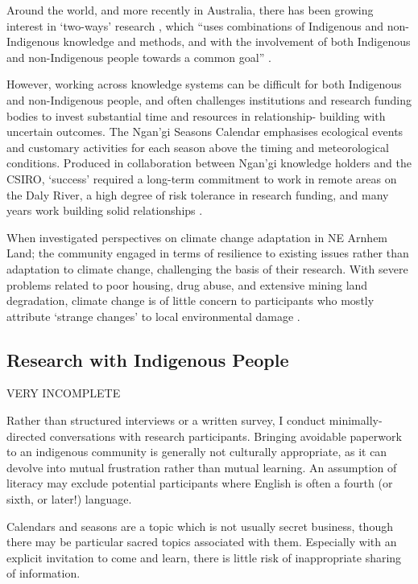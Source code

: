 Around the world, and more recently in Australia, there has been growing
interest in `two-ways' research \citep{turner2009,prober2011},
which ``uses combinations of Indigenous and non-Indigenous knowledge and
methods, and with the involvement of both Indigenous and non-Indigenous people
towards a common goal'' \citep{ens2014}.

However, working across knowledge systems can be difficult for both Indigenous
and non-Indigenous people, and often challenges institutions and research
funding bodies to invest substantial time and resources in relationship-
building with uncertain outcomes.  The Ngan'gi Seasons Calendar emphasises
ecological events and customary activities for each season above the timing and
meteorological conditions.  Produced in collaboration between Ngan'gi knowledge
holders and the CSIRO, `success' required a long-term commitment to work in
remote areas on the Daly River, a high degree of risk tolerance in
research funding, and many years work building solid relationships \citep{woodward2010}.


When \citet{petheram2010} investigated perspectives on climate change
adaptation in NE Arnhem Land; the community engaged in terms of resilience to
existing issues rather than adaptation to climate change, challenging the basis
of their research.  With severe problems related to poor housing, drug abuse,
and extensive mining land degradation, climate change is of little concern to
participants who mostly attribute `strange changes' to local environmental
damage \citep{green2010a}.


\subsection{Research with Indigenous People}

VERY INCOMPLETE

Rather than structured interviews or a written survey, I conduct minimally-
directed conversations with research participants.  Bringing avoidable
paperwork to an indigenous community is generally not culturally appropriate,
as it can devolve into mutual frustration rather than mutual learning.  An
assumption of literacy may exclude potential participants where English is
often a fourth (or sixth, or later!) language.

Calendars and seasons are a topic which is not usually secret business, though
there may be particular sacred topics associated with them.  Especially with an
explicit invitation to come and learn, there is little risk of inappropriate
sharing of information.


